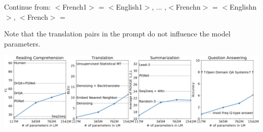 {

{\color{red} Continue from: $<$French1$>$ = $<$English1$>$, ... ,$<$Frenchn$>$ = $<$Englishn$>$, $<$French$>$ =}

\vfill
Note that the translation pairs in the prompt do not influence the model parameters.

\vfill
\centerline{\includegraphics[width = 9in]{../images/GPT-2a}}



}

